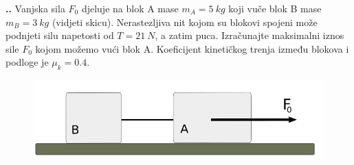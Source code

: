 


\noindent 
\textbf{
\thecjelina.\thezadatak.}
Vanjska sila $F_0$ djeluje na blok A mase $m_A= 5\ kg$ koji vuče blok B mase $m_B= 3\ kg$ (vidjeti skicu). Nerastezljiva nit kojom su blokovi spojeni može podnjeti silu napetosti od  $T=21\ N$, a zatim puca. Izračunajte maksimalni iznos sile $F_0$ kojom možemo vući blok A. Koeficijent kinetičkog trenja između blokova i podloge je $\mu_k=0.4$.


\begin{figure}[h]%
  \begin{center}
    \includegraphics[scale=0.30]{../03_Dinamika_materijalne_tocke/Zadatak_D301.png}
  \end{center}
\end{figure}


